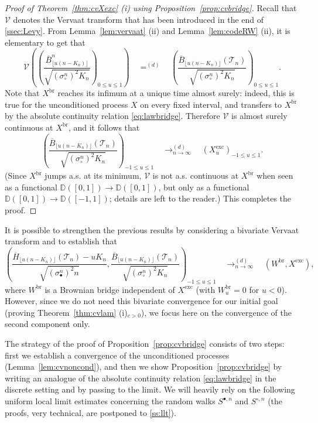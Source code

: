 \documentclass[10pt]{amsart}
\theoremstyle{definition}\newtheorem{defi}[theo]{Definition}\newtheorem{rema}[theo]{Remark}\newtheorem{exam}[theo]{Example}\newtheorem{exem}[theo]{Example}\newtheorem{nota}[theo]{Notation}
\newcommand{\D}{\mathbb{D}}
\def\Vc{\mathcal{V}}
\def\scn{\sigma_{\circ}^{n}}
\def\sbn{\sigma_{\bullet}^{n}}
\def\Sbn{S^{\bullet,n}}
\def\Scn{S^{\circ,n}}
\def\oB{\overline{B}}
\def \Xexc{X^{\mathrm{exc}}}
\def \Xbr{X^{\mathrm{br}}}
\def\Ts{\mathscr{T}}
\begin{document}
\begin{proof}[Proof of Theorem~\ref{thm:cvXexc} (i) using Proposition~\ref{prop:cvbridge}] Recall that $\Vc$ denotes the Vervaat transform that has been introduced in the end of \cref{ssec:Levy}. From Lemma~\ref{lem:vervaat} (ii) and Lemma~\ref{lem:codeRW} (ii), it is elementary to get that
\[ \Vc \left(  \left(  \frac{\oB^{n}_{\lfloor u (n-K_{n}) \rfloor}}{ \sqrt{ (\scn)^{2} K_{n} }}  \right) _{{0 \leq u \leq 1}} \right) \quad \mathop{=}^{(d)}  \quad  \left( \frac{\oB_{\lfloor u (n-K_{n}) \rfloor}(\Ts_{n})}{ \sqrt{ (\scn)^{2} K_{n} }}  \right)_{ 0 \leq u \leq 1}.\]
Note that $\Xbr$ reaches its infimum at a unique time almost surely:
indeed, this is true for the unconditioned process $X$ on every fixed interval, and transfers to $\Xbr$ by the absolute continuity relation \eqref{eq:lawbridge}.
Therefore
$\Vc$ is almost surely continuous at $\Xbr$, and it follows that
\begin{equation}
\left( \frac{\oB_{\lfloor u (n-K_{n}) \rfloor}(\Ts_{n})}{ \sqrt{ (\scn)^{2} K_{n} }}  \right)_{ -1 \leq u \leq 1} \quad \mathop{\longrightarrow}_{n \rightarrow \infty}^{(d)} \quad (\Xexc_{u})_{-1 \leq u \leq 1}.
   \label{eq:cvHB}
 \end{equation}
 (Since $\Xbr$ jumps a.s. at its minimum, $\Vc$ is not a.s. continuous at $\Xbr$ when seen as a functional
 $\D([0,1]) \to \D([0,1])$, but only as a functional $\D([0,1]) \to \D([-1,1])$;
 details are left to the reader.)
This completes the proof.
\end{proof}

\begin{remark} It is possible to strengthen the previous results by considering a bivariate Vervaat transform and to establish that
\[   \left( \frac{\overline{H}_{\lfloor u (n-K_{n}) \rfloor}(\Ts_{n})-u K_{n}}{ \sqrt{ (\sbn)^{2} n} }, \frac{\oB_{\lfloor u (n-K_{n}) \rfloor}(\Ts_{n})}{ \sqrt{ (\scn)^{2} K_{n} }}  \right)_{ -1 \leq u \leq 1}   \quad \mathop{\longrightarrow}_{n \rightarrow \infty}^{(d)} \quad  (W^{\mathrm{br}},\Xexc),\]
where $ W^{\mathrm{br}}$ is a Brownian bridge independent of $\Xexc$ (with $W^{\mathrm{br}}_{u}=0$ for $u<0$).
However, since we do not need this bivariate convergence for our initial goal (proving Theorem~\ref{thm:cvlam} (i)$_{c>0}$),
we focus here on the convergence of the second component only.
\end{remark}


The strategy of the proof of Proposition~\ref{prop:cvbridge} consists of two steps: first we establish a convergence of the unconditioned processes (Lemma~\ref{lem:cvnoncond}), and then we show Proposition~\ref{prop:cvbridge} by writing an analogue of the absolute continuity relation \eqref{eq:lawbridge} in the discrete setting and by passing to the limit. We will  heavily rely on the following uniform local limit estimates concerning the random walks $\Sbn$ and $\Scn$ (the proofs, very technical, are postponed to \cref{ss:llt}).
\end{document}
